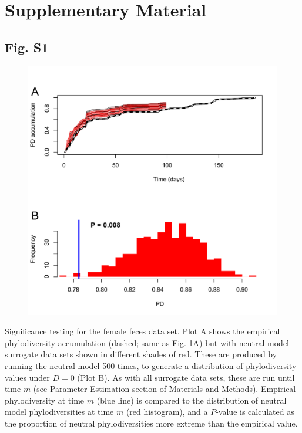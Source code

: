 \documentclass{article}
\begin{document}
\section{Supplementary Material}
{\parindent0pt %
\subsection{Fig. S1}\label{sec:figureS1}
\begin{figure}[ht]
	\centering
	\includegraphics[scale=0.80]{figs/Fig_S1.pdf}
\end{figure}
Significance testing for the female feces data set. Plot A shows the empirical phylodiversity accumulation (dashed; same as \hyperref[sec:figure1]{Fig. 1A}) but with neutral model surrogate data sets shown in different shades of red. These are produced by running the neutral model 500 times, to generate a distribution of phylodiversity values under \(D = 0\) (Plot B). As with all surrogate data sets, these are run until time \(m\) (see \hyperref[sec:parameterEstimation]{Parameter Estimation} section of Materials and Methods). Empirical phylodiversity at time \(m\) (blue line) is compared to the distribution of neutral model phylodiversities at time \(m\) (red histogram), and a \(P\)-value is calculated as the proportion of neutral phylodiversities more extreme than the empirical value. 
\newpage

}
\end{document}
